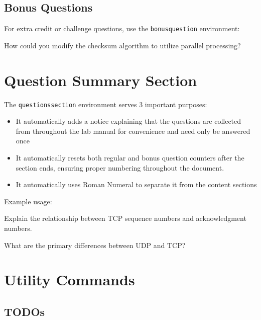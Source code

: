 \documentclass[12pt]{labmanual}
\begin{document}
\subsection{Bonus Questions}

For extra credit or challenge questions, use the \texttt{bonusquestion} environment:

\begin{bonusquestion}
How could you modify the checksum algorithm to utilize parallel processing?
\end{bonusquestion}

\section{Question Summary Section}

The \texttt{questionssection} environment serves 3 important purposes:
\begin{itemize}
\item It automatically adds a notice explaining that the questions are collected from throughout the lab manual for convenience and need only be answered once
\item It automatically resets both regular and bonus question counters after the section ends, ensuring proper numbering throughout the document.
\item It automatically uses Roman Numeral to separate it from the content sections
\end{itemize}

Example usage:

\begin{questionssection}
\begin{question}
Explain the relationship between TCP sequence numbers and acknowledgment numbers.
\end{question}

\begin{question}
What are the primary differences between UDP and TCP?
\end{question}
\end{questionssection}

\section{Utility Commands}

\subsection{TODOs}
\end{document}

